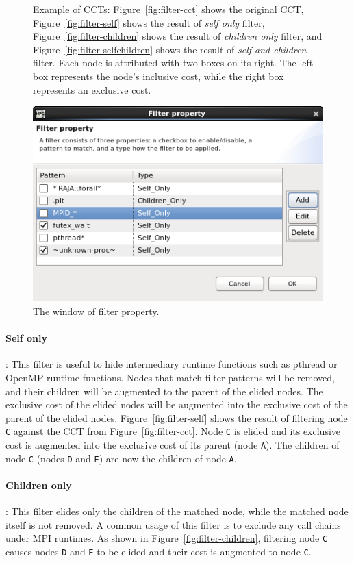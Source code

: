 \begin{figure}
  \caption{Example of CCTs: Figure~\ref{fig:filter-cct} shows the original CCT, Figure~\ref{fig:filter-self} shows the result of \emph{self only} filter,
	   Figure~\ref{fig:filter-children} shows the result of \emph{children only} filter, and Figure~\ref{fig:filter-selfchildren} shows the result of \emph{self and children} filter.
 Each node is attributed with two boxes on its right.  The left box represents the node's inclusive cost, while the right box represents an exclusive cost.}
  \label{fig:filter}
\end{figure}
\begin{figure}
 \centering
 \includegraphics[scale=.6]{fig/hpcviewer-filter-window.png}
 \caption{The window of filter property.}
 \label{fig:filter-window}
\end{figure}

\paragraph{Self only}: This filter is useful to hide intermediary runtime functions such as pthread or OpenMP runtime functions. 
Nodes that match filter patterns will be removed, and their children will be augmented to the parent of the elided nodes.
The exclusive cost of the elided nodes will be augmented into the exclusive cost of the parent of the elided nodes.
Figure~\ref{fig:filter-self} shows the result of filtering node \texttt{C} against the CCT from Figure~\ref{fig:filter-cct}. Node \texttt{C} is elided and its exclusive cost is augmented into the exclusive cost of its parent (node \texttt{A}). The children of node \texttt{C} (nodes \texttt{D} and \texttt{E}) are now the children of node \texttt{A}.
\paragraph{Children only}: This filter elides only the children of the matched node, while the matched node itself is not removed. 
A common usage of this filter is to exclude any call chains under MPI runtimes.
As shown in Figure~\ref{fig:filter-children}, filtering node \texttt{C} causes nodes \texttt{D} and \texttt{E} to be elided and their cost is augmented to node \texttt{C}. 
